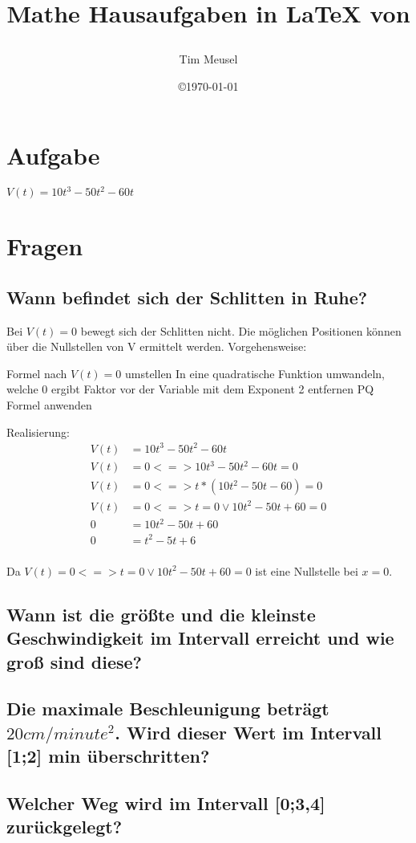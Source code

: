\documentclass[a4paper,11pt]{scrartcl}
\author{Tim Meusel}
\title{Mathe Hausaufgaben in \LaTeX{} von \author{}}
\date{\copyright\today}
\begin{document}
\maketitle

\section{Aufgabe}

$V(t) = 10t^3 - 50t^2 - 60t$

\section{Fragen}

\subsection{Wann befindet sich der Schlitten in Ruhe?}
Bei $V(t) = 0$ bewegt sich der Schlitten nicht. Die möglichen Positionen können
über die Nullstellen von V ermittelt werden. Vorgehensweise:

\begin{outline}
  \1 Formel nach $V(t) = 0$ umstellen
  \1 In eine quadratische Funktion umwandeln, welche 0 ergibt
  \1 Faktor vor der Variable mit dem Exponent 2 entfernen
  \1 PQ Formel anwenden
\end{outline}

Realisierung:
\begin{align*}
  V(t) &= 10t^3 - 50t^2 - 60t                   \\
  V(t) &= 0 <=> 10t^3 - 50t^2 - 60t = 0         \\
  V(t) &= 0 <=> t * (10t^2 - 50t - 60) = 0      \\
  V(t) &= 0 <=> t = 0 \vee 10t^2 - 50t + 60 = 0 \\
     0 &= 10t^2 - 50t + 60                      \\
     0 &= t^2 - 5t + 6                          \\
\end{align*}

Da $V(t) = 0 <=> t = 0 \vee 10t^2 - 50t + 60 = 0$ ist eine Nullstelle bei $x = 0$.

\subsection{Wann ist die größte und die kleinste Geschwindigkeit im Intervall
erreicht und wie groß sind diese?}

\subsection{Die maximale Beschleunigung beträgt $20cm / minute^2$. Wird dieser
Wert im Intervall [1;2] min überschritten?}

\subsection{Welcher Weg wird im Intervall [0;3,4] zurückgelegt?}
\end{document}
